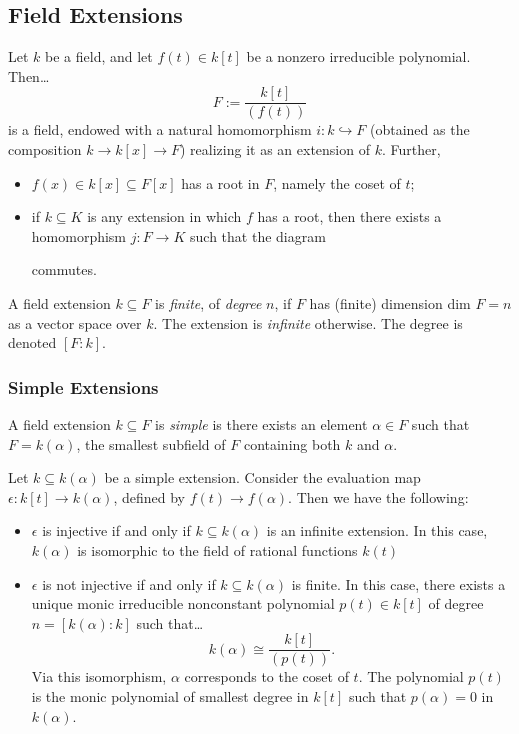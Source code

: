 \subsection{Field Extensions}\label{fieldextensions}

\begin{proposition}
Let $k$ be a field, and let $f(t) \in k[t]$ be a nonzero irreducible polynomial. Then\dots
$$F := \frac{k[t]}{(f(t))}$$
is a field, endowed with a natural homomorphism $i : k \hookrightarrow F$ (obtained as the composition $k \rightarrow k[x] \rightarrow F$)
realizing it as an extension of $k$. Further,
\begin{itemize}
  \item $f(x) \in k[x] \subseteq F[x]$ has a root in $F$, namely the coset of $t$;
  \item if $k \subseteq K$ is any extension in which $f$ has a root, then there exists a homomorphism $j : F \rightarrow K$ such that the diagram
  \begin{figure}[H]
  \centering
  
  \end{figure}
  commutes.
\end{itemize}
\end{proposition}

\noindent A field extension $k \subseteq F$ is \emph{finite}, of \emph{degree} $n$, if $F$ has
(finite) dimension dim $F = n$ as a vector space over $k$. The extension is \emph{infinite} otherwise.
The degree is denoted $[F:k]$.

\subsubsection{Simple Extensions}\label{simpleextensions}

A field extension $k \subseteq F$ is \emph{simple} is there exists an element $\alpha \in F$ such that
$F = k(\alpha)$, the smallest subfield of $F$ containing both $k$ and $\alpha$.

\begin{proposition}
Let $k \subseteq k(\alpha)$ be a simple extension. Consider the evaluation map $\epsilon : k[t] \rightarrow k(\alpha)$,
defined by $f(t) \rightarrow f(\alpha)$. Then we have the following:
\begin{itemize}
  \item $\epsilon$ is injective if and only if $k \subseteq k(\alpha)$ is an infinite extension. In this case,
  $k(\alpha)$ is isomorphic to the field of rational functions $k(t)$
  \item $\epsilon$ is not injective if and only if $k \subseteq k(\alpha)$ is finite. In this case, there exists
  a unique monic irreducible nonconstant polynomial $p(t) \in k[t]$ of degree $n = [k(\alpha) : k]$ such that\dots
  $$k(\alpha) \cong \frac{k[t]}{(p(t))}.$$
  Via this isomorphism, $\alpha$ corresponds to the coset of $t$. The polynomial $p(t)$ is the monic polynomial
  of smallest degree in $k[t]$ such that $p(\alpha) = 0$ in $k(\alpha)$.
\end{itemize}
\end{proposition}

